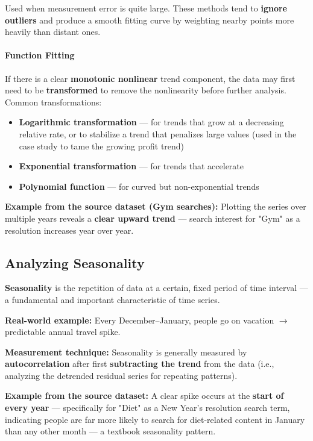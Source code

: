 \documentclass[12pt,openany]{book}
\begin{document}
Used when measurement error is quite large. These methods tend to \textbf{ignore outliers} and produce a smooth fitting curve by weighting nearby points more heavily than distant ones.

\paragraph{Function Fitting}

If there is a clear \textbf{monotonic nonlinear} trend component, the data may first need to be \textbf{transformed} to remove the nonlinearity before further analysis. Common transformations:

\begin{itemize}[leftmargin=*]
    \item \textbf{Logarithmic transformation} --- for trends that grow at a decreasing relative rate, or to stabilize a trend that penalizes large values (used in the case study to tame the growing profit trend)
    \item \textbf{Exponential transformation} --- for trends that accelerate
    \item \textbf{Polynomial function} --- for curved but non-exponential trends
\end{itemize}

\textbf{Example from the source dataset (Gym searches):} Plotting the series over multiple years reveals a \textbf{clear upward trend} --- search interest for "Gym" as a resolution increases year over year.

\subsection{Analyzing Seasonality}

\textbf{Seasonality} is the repetition of data at a certain, fixed period of time interval --- a fundamental and important characteristic of time series.

\textbf{Real-world example:} Every December--January, people go on vacation \(\rightarrow\) predictable annual travel spike.

\textbf{Measurement technique:} Seasonality is generally measured by \textbf{autocorrelation} after first \textbf{subtracting the trend} from the data (i.e., analyzing the detrended residual series for repeating patterns).

\textbf{Example from the source dataset:} A clear spike occurs at the \textbf{start of every year} --- specifically for "Diet" as a New Year's resolution search term, indicating people are far more likely to search for diet-related content in January than any other month --- a textbook seasonality pattern.
\end{document}
